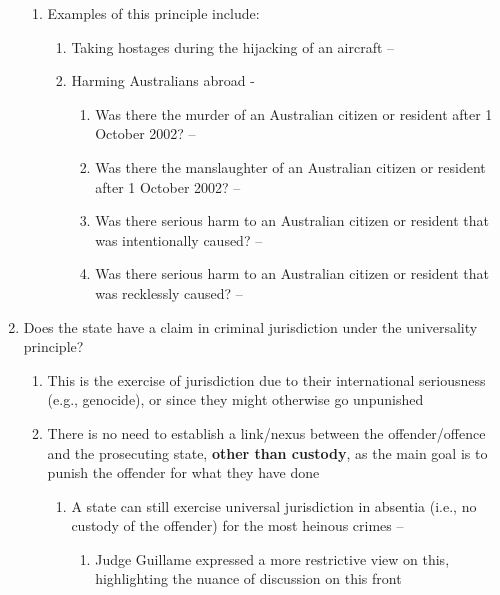 \begin{enumerate}
\begin{enumerate}
        \item Examples of this principle include:
        \begin{enumerate}
            \item Taking hostages during the hijacking of an aircraft -- 
            \item Harming Australians abroad - 
            \begin{enumerate}
                \item Was there the murder of an Australian citizen or resident after 1 October 2002? -- 
                \item Was there the manslaughter of an Australian citizen or resident after 1 October 2002? -- 
                \item Was there serious harm to an Australian citizen or resident that was intentionally caused? -- 
                \item Was there serious harm to an Australian citizen or resident that was recklessly caused? -- 
            \end{enumerate}
        \end{enumerate}
    \end{enumerate}
    \item Does the state have a claim in criminal jurisdiction under the universality principle?
    \begin{enumerate}
        \item This is the exercise of jurisdiction due to their international seriousness (e.g., genocide), or since they might otherwise go unpunished
        \item There is no need to establish a link/nexus between the offender/offence and the prosecuting state, \textbf{other than custody}, as the main goal is to punish the offender for what they have done
        \begin{enumerate}
            \item A state can still exercise universal jurisdiction in absentia (i.e., no custody of the offender) for the most heinous crimes -- 
            \begin{enumerate}
                \item Judge Guillame expressed a more restrictive view on this, highlighting the nuance of discussion on this front

\end{enumerate}
\end{enumerate}
\end{enumerate}
\end{enumerate}
